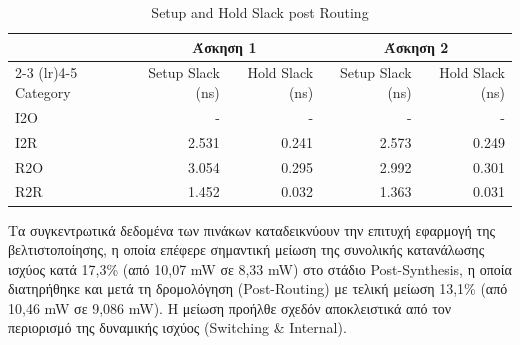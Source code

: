 \begin{table}[H]
    \centering
    \caption{Setup and Hold Slack post Routing}
    \begin{tabular}{lrrrr}
        \toprule
         & \multicolumn{2}{c}{\textbf{Άσκηση 1}} & \multicolumn{2}{c}{\textbf{Άσκηση 2}} \\
        \cmidrule(lr){2-3} \cmidrule(lr){4-5}
        Category & Setup Slack (ns) & Hold Slack (ns) & Setup Slack (ns) & Hold Slack (ns) \\
        \midrule
        I2O & - & - & - & - \\
        I2R & 2.531 & 0.241 & 2.573 & 0.249 \\
        R2O & 3.054 & 0.295 & 2.992 & 0.301 \\
        R2R & 1.452 & 0.032 & 1.363 & 0.031 \\
        \bottomrule
    \end{tabular}
\end{table}

\begin{table}[H]
    \centering
    \caption{Power Consumption per Category post Routing}
\end{table}

Τα συγκεντρωτικά δεδομένα των πινάκων καταδεικνύουν την επιτυχή εφαρμογή της βελτιστοποίησης, η οποία επέφερε σημαντική μείωση της συνολικής κατανάλωσης ισχύος κατά 17,3\% (από 10,07 mW σε 8,33 mW) στο στάδιο Post-Synthesis, η οποία διατηρήθηκε και μετά τη δρομολόγηση (Post-Routing) με τελική μείωση 13,1\% (από 10,46 mW σε 9,086 mW). Η μείωση προήλθε σχεδόν αποκλειστικά από τον περιορισμό της δυναμικής ισχύος (Switching \& Internal). 

